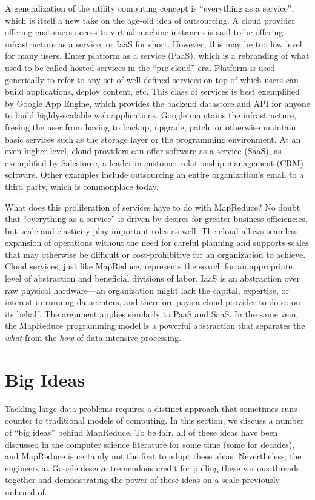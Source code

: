 A generalization of the utility computing concept is ``everything as a
service'', which is itself a new take on the age-old idea of
outsourcing.  A cloud provider offering customers access to virtual
machine instances is said to be offering infrastructure as a service,
or IaaS for short.  However, this may be too low level for many users.
Enter platform as a service (PaaS), which is a rebranding of what used
to be called hosted services in the ``pre-cloud'' era.  Platform is
used generically to refer to any set of well-defined services on top
of which users can build applications, deploy content, etc.  This
class of services is best exemplified by Google App Engine, which
provides the backend datastore and API for anyone to build
highly-scalable web applications.  Google maintains the
infrastructure, freeing the user from having to backup, upgrade,
patch, or otherwise maintain basic services such as the storage layer
or the programming environment.  At an even higher level, cloud
providers can offer software as a service (SaaS), as exemplified by
Salesforce, a leader in customer relationship management (CRM)
software.  Other examples include outsourcing an entire organization's
email to a third party, which is commonplace today.

What does this proliferation of services have to do with MapReduce?
No doubt that ``everything as a service'' is driven by desires for
greater business efficiencies, but scale and elasticity play important
roles as well.  The cloud allows seamless expansion of operations
without the need for careful planning and supports scales that may
otherwise be difficult or cost-prohibitive for an organization to
achieve.  Cloud services, just like MapReduce, represents the search
for an appropriate level of abstraction and beneficial divisions of
labor.  IaaS is an abstraction over raw physical hardware---an
organization might lack the capital, expertise, or interest in running
datacenters, and therefore pays a cloud provider to do so on its
behalf.  The argument applies similarly to PaaS and SaaS.  In the same
vein, the MapReduce programming model is a powerful abstraction that
separates the \emph{what} from the \emph{how} of data-intensive
processing.

\section{Big Ideas}

Tackling large-data problems requires a distinct approach that
sometimes runs counter to traditional models of computing.  In this
section, we discuss a number of ``big ideas'' behind MapReduce.  To be
fair, all of these ideas have been discussed in the computer science
literature for some time (some for decades), and MapReduce is
certainly not the first to adopt these ideas.  Nevertheless, the
engineers at Google deserve tremendous credit for pulling these
various threads together and demonstrating the power of these ideas on
a scale previously unheard of.

